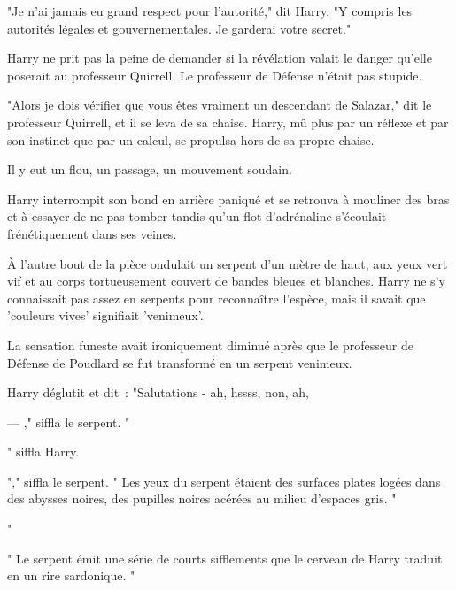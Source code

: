 "Je n'ai jamais eu grand respect pour l'autorité," dit Harry. "Y compris les autorités légales et gouvernementales. Je garderai votre secret."

Harry ne prit pas la peine de demander si la révélation valait le danger qu'elle poserait au professeur Quirrell. Le professeur de Défense n'était pas stupide.

"Alors je dois vérifier que vous êtes vraiment un descendant de Salazar," dit le professeur Quirrell, et il se leva de sa chaise. Harry, mû plus par un réflexe et par son instinct que par un calcul, se propulsa hors de sa propre chaise.

Il y eut un flou, un passage, un mouvement soudain.

Harry interrompit son bond en arrière paniqué et se retrouva à mouliner des bras et à essayer de ne pas tomber tandis qu'un flot d'adrénaline s'écoulait frénétiquement dans ses veines.

À l'autre bout de la pièce ondulait un serpent d'un mètre de haut, aux yeux vert vif et au corps tortueusement couvert de bandes bleues et blanches. Harry ne s'y connaissait pas assez en serpents pour reconnaître l'espèce, mais il savait que 'couleurs vives' signifiait 'venimeux'.

La sensation funeste avait ironiquement diminué après que le professeur de Défense de Poudlard se fut transformé en un serpent venimeux.

Harry déglutit et dit~: "Salutations - ah, hssss, non, ah,

--- ," siffla le serpent. "

" siffla Harry. 

"," siffla le serpent. " Les yeux du serpent étaient des surfaces plates logées dans des abysses noires, des pupilles noires acérées au milieu d'espaces gris. "

"

" Le serpent émit une série de courts sifflements que le cerveau de Harry traduit en un rire sardonique. "

